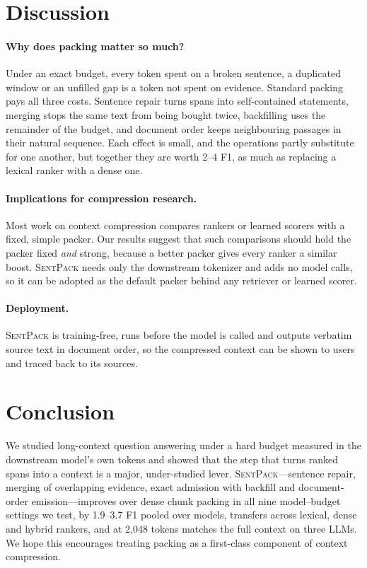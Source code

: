 \documentclass[11pt]{article}
\newcommand{\spk}{\textsc{SentPack}}
\begin{document}
\section{Discussion}

\paragraph{Why does packing matter so much?} Under an exact budget, every token spent on a broken sentence, a duplicated window or an unfilled gap is a token not spent on evidence. Standard packing pays all three costs. Sentence repair turns spans into self-contained statements, merging stops the same text from being bought twice, backfilling uses the remainder of the budget, and document order keeps neighbouring passages in their natural sequence. Each effect is small, and the operations partly substitute for one another, but together they are worth 2--4 F1, as much as replacing a lexical ranker with a dense one.

\paragraph{Implications for compression research.} Most work on context compression compares rankers or learned scorers with a fixed, simple packer. Our results suggest that such comparisons should hold the packer fixed \emph{and} strong, because a better packer gives every ranker a similar boost. \spk{} needs only the downstream tokenizer and adds no model calls, so it can be adopted as the default packer behind any retriever or learned scorer.

\paragraph{Deployment.} \spk{} is training-free, runs before the model is called and outputs verbatim source text in document order, so the compressed context can be shown to users and traced back to its sources.

\section{Conclusion}
We studied long-context question answering under a hard budget measured in the downstream model's own tokens and showed that the step that turns ranked spans into a context is a major, under-studied lever. \spk{}---sentence repair, merging of overlapping evidence, exact admission with backfill and document-order emission---improves over dense chunk packing in all nine model--budget settings we test, by 1.9--3.7 F1 pooled over models, transfers across lexical, dense and hybrid rankers, and at 2,048 tokens matches the full context on three LLMs. We hope this encourages treating packing as a first-class component of context compression.
\end{document}
